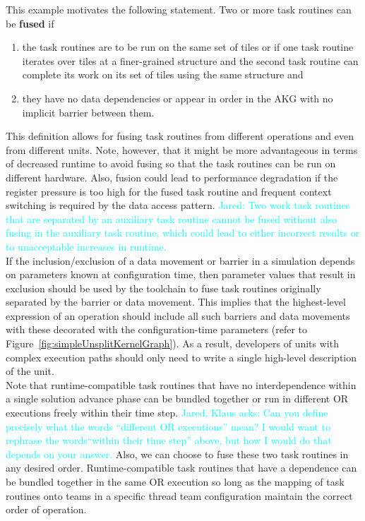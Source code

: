 \documentclass{article}
\newcommand{\Jared}[1]          {\textcolor{cyan}{Jared: #1}}
\newcommand{\JaredQfromKW}[1]   {\textcolor{cyan}{Jared, Klaus asks: #1}}
\newcommand{\shortAKG}   {AKG\xspace}
\newcommand{\shortOR}   {OR\xspace}
\newcommand{\AKG}    {\shortAKG}
\newcommand{\OR}        {\shortOR}
\newcommand{\taskroutine}        {task routine\xspace}
\newcommand{\taskroutines}       {task routines\xspace}
\begin{document}

This example motivates the following statement.  Two or more \taskroutines can be
\textbf{fused} if
\begin{enumerate}
\item{the \taskroutines are to be run on the same set of tiles or if one \taskroutine
iterates over tiles at a finer-grained structure and the second \taskroutine can
complete its work on its set of tiles using the same structure and}
\item{they have no data dependencies or appear in order in the \AKG with
no implicit barrier between them.}
\end{enumerate}
This definition allows for fusing \taskroutines from different operations and even from
different units.
Note, however, that it might be more advantageous in terms of decreased runtime
to avoid fusing so that the \taskroutines can be run on different hardware.  Also,
fusion could lead to performance degradation if the register pressure is too
high for the fused \taskroutine and frequent context switching is required by the data
access pattern.  \Jared{Two work \taskroutines that are separated by
an auxiliary \taskroutine cannot be fused without also fusing in the auxiliary \taskroutine,
which could lead to either incorrect results or to unacceptable increases in
runtime.}\\

If the inclusion/exclusion of a data movement or barrier in a simulation depends
on parameters known at configuration time, then parameter values that result in
exclusion should be used by the toolchain to fuse \taskroutines originally separated by
the barrier or data movement.  This implies that the highest-level expression of
an operation should include all such barriers and data movements with these
decorated with the configuration-time parameters (refer to
Figure~\ref{fig:simpleUnsplitKernelGraph}).  As a result, developers of
units with complex execution paths should only need to write a single high-level
description of the unit.\\

Note that runtime-compatible \taskroutines that have no interdependence within a single
solution advance phase can be bundled together or run in different \OR executions freely
within their time step.
\JaredQfromKW{Can you define precisely what the words ``different \OR executions'' mean?
I would want to rephrase the words``within their time step'' above, but how I would
do that depends on your answer.}
Also, we can choose to fuse these two \taskroutines in any
desired order.  Runtime-compatible \taskroutines that have a dependence can be bundled
together in the same \OR execution so long as the mapping of \taskroutines onto
teams in a specific thread team configuration maintain the correct order of
operation.\\
\end{document}
